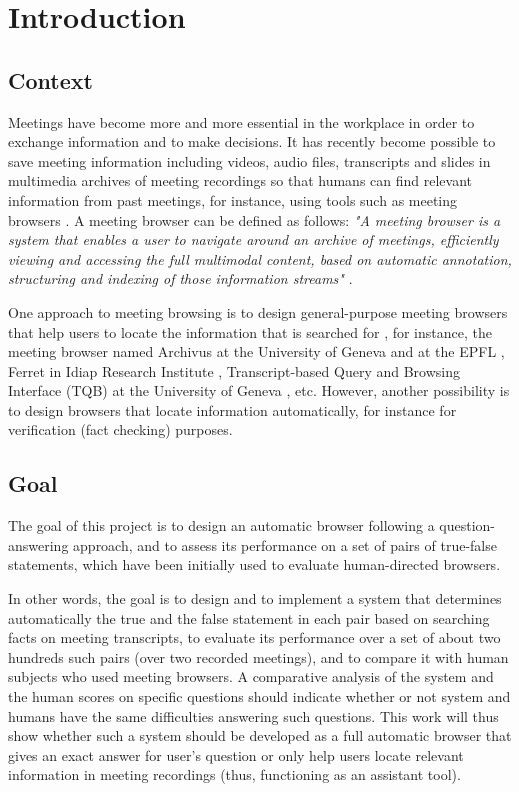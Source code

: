 \newpage
\chapter{Introduction}

\section{Context}
Meetings have become more and more essential in the workplace in order to exchange information and to make decisions. It has recently become possible to save meeting information including videos, audio files, transcripts and slides in multimedia archives of meeting recordings so that humans can find relevant information from past meetings, for instance, using tools such as meeting browsers \cite{popescubelis:tbe}.  A meeting browser can be defined as follows: \textit{"A meeting browser is a system that enables a user to navigate around an archive of meetings, efficiently viewing and accessing the full multimodal content, based on automatic annotation, structuring and indexing of those information streams"} \cite{mccowan2005amc}. 

One approach to meeting browsing is to design general-purpose meeting browsers that help users to locate the information that is searched for \cite{lalanne2005imm}, for instance, the meeting browser named Archivus at the University of Geneva and at the EPFL \cite{lisowska2004asa}, Ferret in Idiap Research Institute \cite{wellner2004brm}, Transcript-based Query and Browsing Interface (TQB) at the University of Geneva \cite{popescubelis:tam}, etc. However, another possibility is to design browsers that locate information automatically, for instance for verification (fact checking) purposes.

\section{Goal }

The goal of this project is to design an automatic browser following a question-answering approach, and to assess its performance on a set of pairs of true-false statements, which have been initially used to evaluate human-directed browsers.

In other words, the goal is to design and to implement a system that determines automatically the true and the false statement in each pair based on searching facts on meeting transcripts, to evaluate its performance over a set of about two hundreds such pairs (over two recorded meetings), and to compare it with human subjects who used meeting browsers. A comparative analysis of the system and the human scores on specific questions should indicate whether or not system and humans have the same difficulties answering such questions. This work will thus show whether such a system should be developed as a full automatic browser that gives an exact answer for user's question or only help users locate relevant information in meeting recordings (thus, functioning as an assistant tool).

